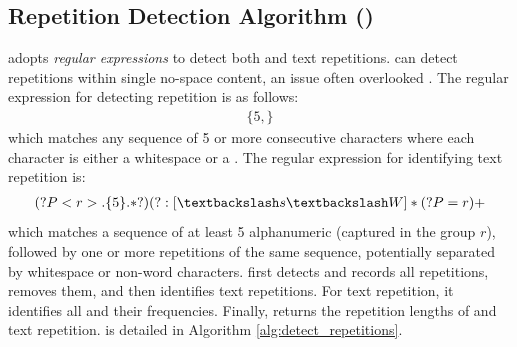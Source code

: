 \subsection{Repetition Detection Algorithm (\alg)}
\label{sec:rep_det}
\alg adopts \textit{regular expressions} to detect both \nwc and text repetitions. \alg can detect repetitions within single no-space content, an issue often overlooked \cite{Fu2020ATA}. 
The regular expression for detecting \nwc repetition is as follows:
\begin{align}
    [\textbackslash s\textbackslash W]\{5,\}
\end{align}
\noindent 
which matches any sequence of 5 or more consecutive characters where each character is either a whitespace or a \nwc. The regular expression for identifying text repetition is: 
\begin{align}
 (?P<r>.\{5\}.*?)(?:[\textbackslash s\textbackslash W]*(?P=r)+   
\end{align}
which matches a sequence of at least 5 alphanumeric (captured in the group $r$), followed by one or more repetitions of the same sequence, potentially separated by whitespace or non-word characters.
\alg first detects and records all \nwc repetitions, removes them, and then identifies text repetitions. For text repetition, it identifies all \mrses and their frequencies. Finally, \alg returns the repetition lengths of \nwc and text repetition. \alg is detailed in Algorithm \ref{alg:detect_repetitions}.

